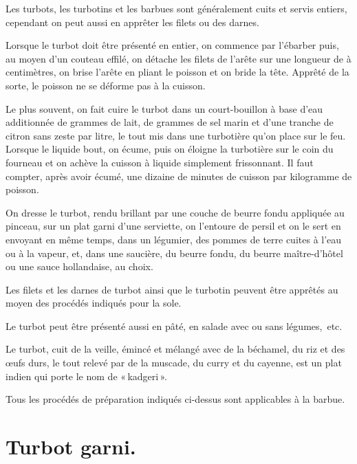 Les turbots, les turbotins et les barbues sont généralement cuits et servis
entiers, cependant on peut aussi en apprêter les filets ou des darnes.

Lorsque le turbot doit être présenté en entier, on commence par l'ébarber puis,
au moyen d'un couteau effilé, on détache les filets de l'arête sur une longueur
de {\mmm} à {\mmm} centimètres, on brise l’arête en pliant le poisson
et on bride la tête. Apprêté de la sorte, le poisson ne se déforme pas à la
cuisson.

Le plus souvent, on fait cuire le turbot dans un court-bouillon à base d'eau
additionnée de {\mmm} grammes de lait, de {\mmm} grammes de sel
marin et d'une tranche de citron sans zeste par litre, le tout mis dans une
turbotière qu'on place sur le feu. Lorsque le liquide bout, on écume, puis on
éloigne la turbotière sur le coin du fourneau et on achève la cuisson à liquide
simplement frissonnant. Il faut compter, après avoir écumé, une dizaine de
minutes de cuisson par kilogramme de poisson.

On dresse le turbot, rendu brillant par une couche de beurre fondu appliquée au
pinceau, sur un plat garni d'une serviette, on l'entoure de persil et on le
sert en envoyant en même temps, dans un légumier, des pommes de terre cuites
à l'eau ou à la vapeur, et, dans une saucière, du beurre fondu, du beurre
maître-d'hôtel ou une sauce hollandaise, au choix.

\sk

Les filets et les darnes de turbot ainsi que le turbotin peuvent être apprêtés
au moyen des procédés indiqués pour la sole.

\sk

Le turbot peut être présenté aussi en pâté, en salade avec ou sans légumes, etc.

\sk

Le turbot, cuit de la veille, émincé et mélangé avec de la béchamel, du riz et
des œufs durs, le tout relevé par de la muscade, du curry et du cayenne, est un
plat indien qui porte le nom de « kadgeri ».

\sk


Tous les procédés de préparation indiqués ci-dessus sont applicables à la
barbue.

\section*{\centering Turbot garni.}

